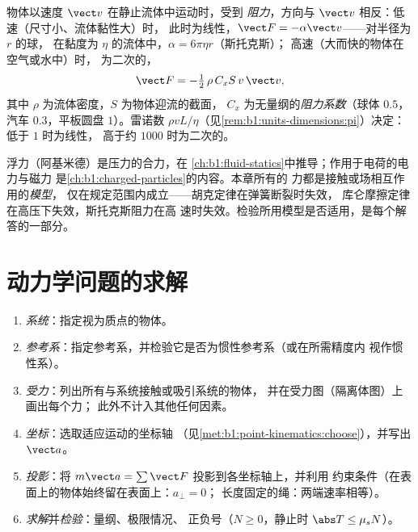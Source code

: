 \begin{proposition}[流体摩擦]\label{prop:b1:newton-dynamics:drag}
物体以速度 $\vect v$ 在静止流体中运动时，受到
\emph{阻力}，方向与 $\vect v$ 相反：低速（尺寸小、流体黏性大）时，
此时为线性，$\vect F = -\alpha\vect v$——对半径为 $r$ 的球，
在黏度为 $\eta$ 的流体中，$\alpha = 6\pi\eta r$（斯托克斯）；
高速（大而快的物体在空气或水中）时，
为二次的，
\[
\vect F = -\tfrac12\,\rho\,C_xS\,v\,\vect v ,
\]
其中 $\rho$ 为流体密度，$S$ 为物体迎流的截面，
$C_x$ 为无量纲的\emph{阻力系数}（球体 $0.5$，
汽车 $0.3$，平板圆盘 $1$）。雷诺数
$\rho vL/\eta$（见\cref{rem:b1:units-dimensions:pi}）决定：低于 $1$ 时为线性，
高于约 $1000$ 时为二次的。
\end{proposition}
\admitted

\begin{remark}[其他力]\label{rem:b1:newton-dynamics:others}
浮力（阿基米德）是压力的合力，在
\cref{ch:b1:fluid-statics}中推导；作用于电荷的电力与磁力
是\cref{ch:b1:charged-particles}的内容。本章所有的
力都是接触或场相互作用的\emph{模型}，
仅在规定范围内成立——胡克定律在弹簧断裂时失效，
库仑摩擦定律在高压下失效，斯托克斯阻力在高
速时失效。检验所用模型是否适用，是每个解答的一部分。
\end{remark}

\section{动力学问题的求解}

\begin{method}[从情境到方程]\label{met:b1:newton-dynamics:method}
\begin{enumerate}
  \item \emph{系统}：指定视为质点的物体。
  \item \emph{参考系}：指定参考系，并检验它是否为惯性参考系（或在所需精度内
        视作惯性系）。
  \item \emph{受力}：列出所有与系统接触或吸引系统的物体，
        并在受力图（隔离体图）上画出每个力；
        此外不计入其他任何因素。
  \item \emph{坐标}：选取适应运动的坐标轴
        （见\cref{met:b1:point-kinematics:choose}），并写出 $\vect a$。
  \item \emph{投影}：将 $m\vect a = \sum\vect F$ 投影到各坐标轴上，并利用
        约束条件（在表面上的物体始终留在表面上：$a_\perp = 0$；
        长度固定的绳：两端速率相等）。
  \item \emph{求解}并\emph{检验}：量纲、极限情况、
        正负号（$N \geq 0$，静止时 $\abs T \leq \mu_sN$）。
\end{enumerate}
\end{method}

